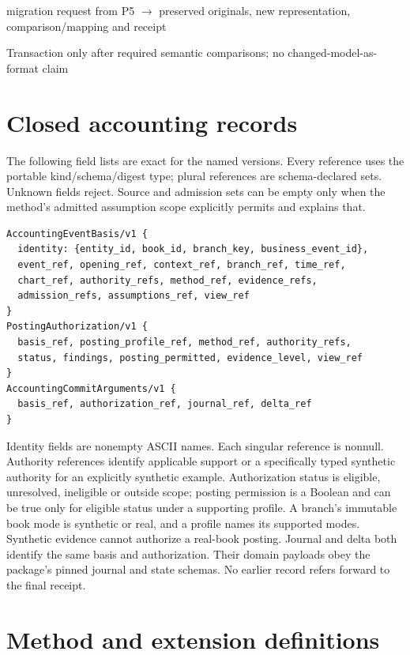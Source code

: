 migration request from P5 \ensuremath{\rightarrow} preserved originals, new representation, comparison/mapping and receipt

Transaction only after required semantic comparisons; no changed-model-as-format claim

\section{Closed accounting records}

The following field lists are exact for the named versions. Every reference
uses the portable kind/schema/digest type; plural references are schema-declared
sets. Unknown fields reject. Source and admission sets can be empty only when
the method's admitted assumption scope explicitly permits and explains that.

\begin{lstlisting}
AccountingEventBasis/v1 {
  identity: {entity_id, book_id, branch_key, business_event_id},
  event_ref, opening_ref, context_ref, branch_ref, time_ref,
  chart_ref, authority_refs, method_ref, evidence_refs,
  admission_refs, assumptions_ref, view_ref
}
PostingAuthorization/v1 {
  basis_ref, posting_profile_ref, method_ref, authority_refs,
  status, findings, posting_permitted, evidence_level, view_ref
}
AccountingCommitArguments/v1 {
  basis_ref, authorization_ref, journal_ref, delta_ref
}
\end{lstlisting}

Identity fields are nonempty ASCII names. Each singular reference is nonnull.
Authority references identify applicable support or a specifically typed
synthetic authority for an explicitly synthetic example. Authorization status
is eligible, unresolved, ineligible or outside scope; posting permission is a
Boolean and can be true only for eligible status under a supporting profile.
A branch's immutable book mode is synthetic or real, and a profile names its
supported modes. Synthetic evidence cannot authorize a real-book posting.
Journal and delta both identify the same basis and authorization. Their domain
payloads obey the package's pinned journal and state schemas. No earlier record
refers forward to the final receipt.

\section{Method and extension definitions}

